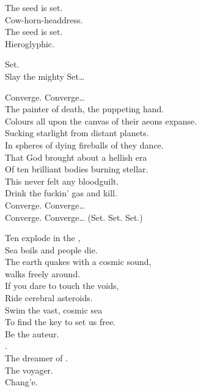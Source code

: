The seed is set. \\
Cow-horn-headdress. \\
The seed is set. \\
Hieroglyphic. \\


Set. \\
Slay the mighty Set… \\


Converge. Converge… \\

The painter of death, the puppeting hand. \\
Colours all upon the canvas of their aeons expanse. \\
Sucking starlight from distant planets. \\
In spheres of dying fireballs of  they dance. \\

That God brought about a hellish era\\
Of ten brilliant bodies burning stellar. \\
This  never felt any bloodguilt. \\
Drink the fuckin' gas and kill. \\

Converge. Converge… \\
Converge. Converge… (Set. Set. Set.) \\




Ten  explode in the , \\
Sea boils and people die. \\
The earth quakes with a cosmic sound, \\
 walks freely around. \\
If you dare to touch the voids, \\
Ride cerebral asteroids. \\
Swim the vast, cosmic sea \\
To find the key to set us free. \\

Be the auteur. \\
. \\
The dreamer of . \\
The voyager. \\
Chang'e. \\


